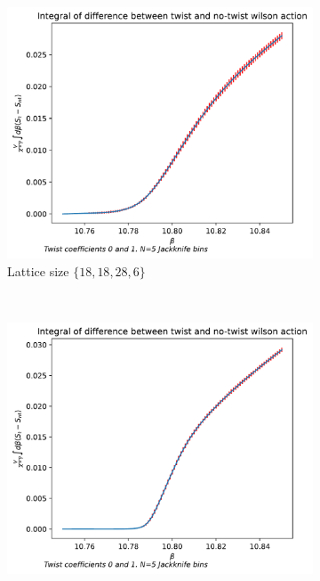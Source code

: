 \documentclass[english,twoside,openright]{UH_TCM_MSc}
\begin{document}
\begin{figure}[htpb]
    \centering
    \begin{subfigure}[t]{0.5\textwidth}
        \centering
        \includegraphics[width=\textwidth]{final_plots/18_18_28/actiion_diff_int_0-1.pdf}
        \caption{Lattice size $\{18,18,28,6\}$}
    \end{subfigure}%
    ~ 
    \begin{subfigure}[t]{0.5\textwidth}
        \centering
        \includegraphics[width=\textwidth]{final_plots/24_24_36_highlight/action_diff_int_0-1.pdf}

\end{subfigure}
\end{figure}
\end{document}
